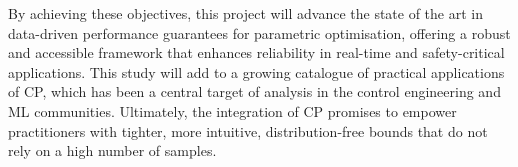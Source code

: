 By achieving these objectives, this project will advance the state of the art in data-driven performance guarantees for parametric optimisation, offering a robust and accessible framework that enhances reliability in real-time and safety-critical applications. This study will add to a growing catalogue of practical applications of CP, which has been a central target of analysis in the control engineering and ML communities. Ultimately, the integration of CP promises to empower practitioners with tighter, more intuitive, distribution-free bounds that do not rely on a high number of samples.
